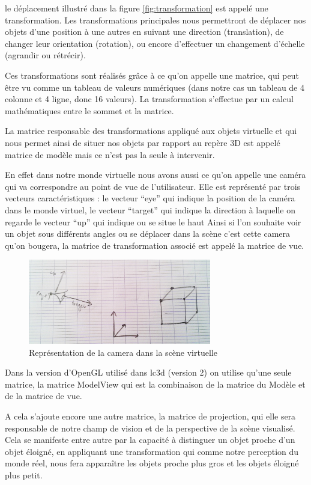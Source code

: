 le déplacement illustré dans la figure \ref{fig:transformation} est appelé une transformation. Les transformations principales nous permettront de déplacer nos objets d’une position à une autres en suivant une direction (translation), de changer leur orientation (rotation), ou encore d’effectuer un changement d’échelle (agrandir ou rétrécir).

Ces transformations sont réalisés grâce à ce qu’on appelle une matrice, qui peut être vu comme un tableau de valeurs numériques (dans notre cas un tableau de 4 colonne et 4 ligne, donc 16 valeurs). La transformation s’effectue par un calcul mathématiques entre le sommet et la matrice.

La matrice responsable des transformations appliqué aux objets virtuelle et qui nous permet ainsi de situer nos objets par rapport au repère 3D est appelé matrice de modèle mais ce n’est pas la seule à intervenir.

En effet dans notre monde virtuelle nous avons aussi ce qu’on appelle une caméra qui va correspondre au point de vue de l’utilisateur. Elle est représenté par trois vecteurs caractéristiques :
le vecteur “eye” qui indique la position de la caméra dans le monde virtuel, 
le vecteur “target” qui indique la direction à laquelle on regarde
le vecteur “up” qui indique ou se situe le haut
Ainsi si l’on souhaite voir un objet sous différents angles ou se déplacer dans la scène c’est cette camera qu’on bougera, la matrice de transformation associé est appelé la matrice de vue.

\begin{figure}[!ht]
\centering
\includegraphics[width = 8cm] {images/croquisVue.jpg}
\caption{Représentation de la camera dans la scène virtuelle}
\label{fig:vue}
\end{figure}

Dans la version d’OpenGL utilisé dans \gls{lc3d} (version 2) on utilise qu’une seule matrice, la matrice ModelView qui est la combinaison de la matrice du Modèle et de la matrice de vue.


A cela s’ajoute encore une autre matrice, la matrice de projection, qui elle sera responsable de notre champ de vision et de la perspective de la scène visualisé. Cela se manifeste entre autre par la capacité à distinguer un objet proche d’un objet éloigné, en appliquant une transformation qui comme notre perception du monde réel, nous fera apparaître les objets proche plus gros et les objets éloigné plus petit.

